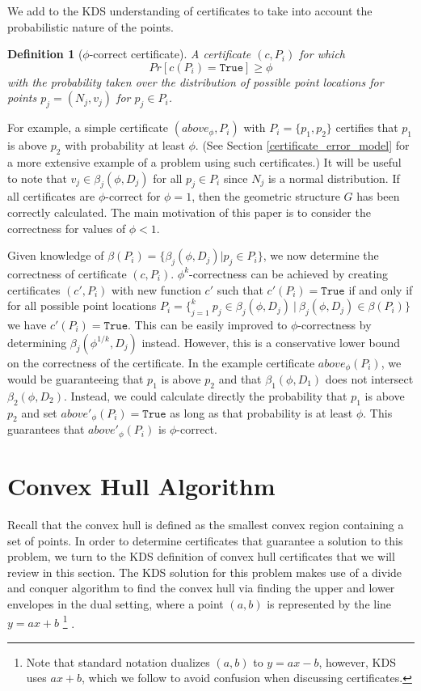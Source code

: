 \documentclass[11pt]{article}
\newtheorem{definition}[theorem]{Definition}
\begin{document}
We add to the KDS understanding of certificates to take into account the probabilistic nature of the points.  
\begin{definition}[$\phi$-correct certificate]
\label{def:certificate}
A certificate $(c, P_i)$ for which
\[ Pr[c(P_i) = \texttt{True}] \geq \phi \]
with the probability taken over the distribution of possible point locations for points $p_j = (N_j, v_j)$ for $p_j \in P_i$. 
\end{definition}

\noindent For example, a simple certificate $(above_\phi, P_i)$ with $P_i = \{p_1, p_2 \}$ certifies that $p_1$ is above $p_2$ with probability at least $\phi$.  (See Section \ref{certificate_error_model} for a more extensive example of a problem using such certificates.)  It will be useful to note that $v_{j} \in \beta_j(\phi, D_j)$ for all $p_j \in P_i$ since $N_j$ is a normal distribution.  If all certificates are $\phi$-correct for $\phi = 1$, then the geometric structure $G$ has been correctly calculated.  The main motivation of this paper is to consider the correctness for values of $\phi < 1$.

Given knowledge of $\beta(P_i) = \{ \beta_j(\phi, D_j) | p_j \in P_i \}$, we now determine the correctness of certificate $(c, P_i)$.  $\phi^k$-correctness can be achieved by creating certificates $(c',P_i)$ with new function $c'$ such that  $c'(P_i) = \texttt{True}$ if and only if for all possible point locations 
$P_i = \{_{j=1}^k ~ p_j \in  \beta_j(\phi, D_j) ~|~ \beta_j(\phi, D_j) \in \beta(P_i) \}$
we have $c'(P_i) = \texttt{True}$.  This can be easily improved to $\phi$-correctness by determining $\beta_j(\phi^{1/k}, D_j)$ instead.  However, this is a conservative lower bound on the correctness of the certificate.  In the example certificate $above_\phi(P_i)$, we would be guaranteeing that $p_1$ is above $p_2$ and that $\beta_1(\phi, D_1)$ does not intersect $\beta_2(\phi, D_2)$.  Instead, we could calculate directly the probability that $p_1$ is above $p_2$ and set $above'_\phi(P_i) = \texttt{True}$ as long as that probability is at least $\phi$.  This guarantees that $above'_\phi(P_i)$ is $\phi$-correct.
 
 
\section{Convex Hull Algorithm}
\label{convex_hull}
Recall that the convex hull is defined as the smallest convex region
containing a set of points.  In order to determine certificates that
guarantee a solution to this problem, we turn to the KDS definition of
convex hull certificates \cite{Basch99MobileData} that we will review in this section.  The KDS solution for this problem makes use
of a divide and conquer algorithm to find the convex hull via finding the 
upper and lower envelopes in the
dual setting, where a point $(a, b)$ is represented by the line $y =
ax + b$ \footnote{Note that standard notation dualizes $(a, b)$ to $y=ax-b$, 
however, KDS \cite{Basch99MobileData} uses $ax+b$, which we follow to avoid confusion when discussing certificates.}
\cite{Basch99MobileData, ORourke1998book}.  
\end{document}
